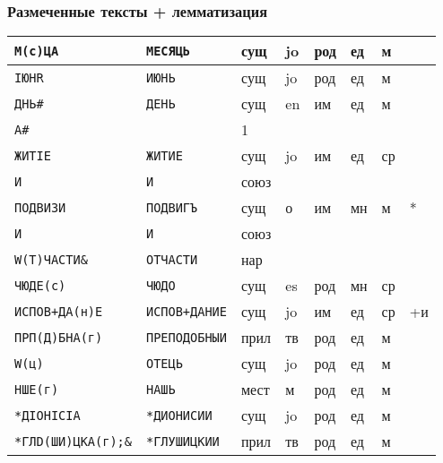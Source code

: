 \begin{frame}
  \frametitle{Размеченные тексты + лемматизация}

  \footnotesize \setlength{\aboverulesep}{0.5pt} \setlength{\belowrulesep}{0.5pt}
  \begin{tabularx}{\textwidth}{XXp{0.75cm}p{0.75cm}p{0.75cm}p{0.75cm}p{0.75cm}p{0.75cm}}
    \toprule
    \texttt{М(с)ЦА} & \texttt{МЕСЯЦЬ}                & сущ  & jo & род & ед & м  &    \\ \midrule
    \texttt{IЮНR} & \texttt{ИЮНЬ}                    & сущ  & jo & род & ед & м  &    \\ \midrule
    \texttt{ДНЬ\#} & \texttt{ДЕНЬ}                   & сущ  & en & им  & ед & м  &    \\ \midrule
    \texttt{А\#} &                                   & 1    &    &     &    &    &    \\ \midrule
    \texttt{ЖИТIЕ} & \texttt{ЖИТИЕ}                  & сущ  & jo & им  & ед & ср &    \\ \midrule
    \texttt{И} & \texttt{И}                          & союз &    &     &    &    &    \\ \midrule
    \texttt{ПОДВИЗИ} & \texttt{ПОДВИГЪ}              & сущ  & о  & им  & мн & м  & *  \\ \midrule
    \texttt{И} & \texttt{И}                          & союз &    &     &    &    &    \\ \midrule
    \texttt{W(Т)ЧАСТИ\&} & \texttt{ОТЧАСТИ}          & нар  &    &     &    &    &    \\ \midrule
    \texttt{ЧЮДЕ(с)} & \texttt{ЧЮДО}                 & сущ  & es & род & мн & ср &    \\ \midrule
    \texttt{ИСПОВ+ДА(н)Е} & \texttt{ИСПОВ+ДАНИЕ}     & сущ  & jo & им  & ед & ср & +и \\ \midrule
    \texttt{ПРП(Д)БНА(г)} & \texttt{ПРЕПОДОБНЫИ}     & прил & тв & род & ед & м  &    \\ \midrule
    \texttt{W(ц)} & \texttt{ОТЕЦЬ}                   & сущ  & jo & род & ед & м  &    \\ \midrule
    \texttt{НШЕ(г)} & \texttt{НАШЬ}                  & мест & м  & род & ед & м  &    \\ \midrule
    \texttt{*ДIОНIСIА} & \texttt{*ДИОНИСИИ}          & сущ  & jo & род & ед & м  &    \\ \midrule
    \texttt{*ГЛD(ШИ)ЦКА(г);\&} & \texttt{*ГЛУШИЦКИИ} & прил & тв & род & ед & м  &    \\ \bottomrule
  \end{tabularx}
\end{frame}

